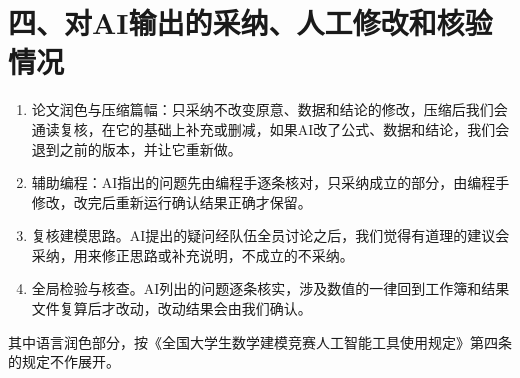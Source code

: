 \documentclass[UTF8,fontset=none,a4paper,zihao=5]{ctexart}
\begin{document}
\section*{四、对AI输出的采纳、人工修改和核验情况}
\begin{enumerate}
\item 论文润色与压缩篇幅：只采纳不改变原意、数据和结论的修改，压缩后我们会通读复核，在它的基础上补充或删减，如果AI改了公式、数据和结论，我们会退到之前的版本，并让它重新做。
\item 辅助编程：AI指出的问题先由编程手逐条核对，只采纳成立的部分，由编程手修改，改完后重新运行确认结果正确才保留。
\item 复核建模思路。AI提出的疑问经队伍全员讨论之后，我们觉得有道理的建议会采纳，用来修正思路或补充说明，不成立的不采纳。
\item 全局检验与核查。AI列出的问题逐条核实，涉及数值的一律回到工作簿和结果文件复算后才改动，改动结果会由我们确认。
\end{enumerate}

其中语言润色部分，按《全国大学生数学建模竞赛人工智能工具使用规定》第四条的规定不作展开。
\end{document}
